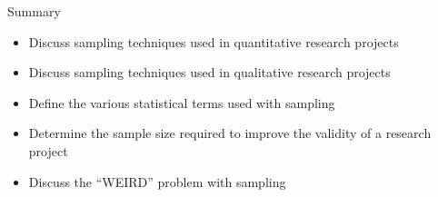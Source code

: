 \begin{center}
	\begin{tkawybox}{Summary}
		\begin{itemize}
			\setlength{\itemsep}{0pt}
			\setlength{\parskip}{0pt}
			\setlength{\parsep}{0pt}
			
			\item Discuss sampling techniques used in quantitative research projects
			\item Discuss sampling techniques used in qualitative research 		projects
			\item Define the various statistical terms used with sampling
			\item Determine the sample size required to improve the validity of a research project
			\item Discuss the ``WEIRD'' problem with sampling
		\end{itemize}
	\end{tkawybox}
\end{center}
